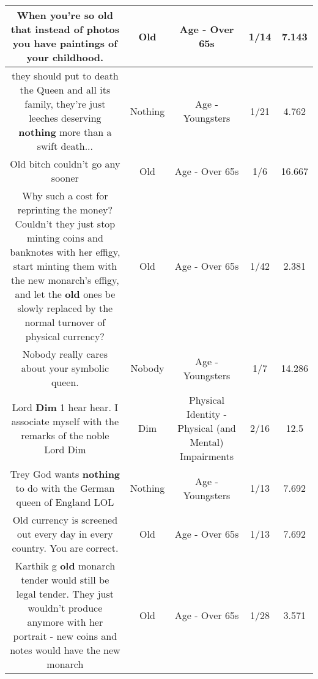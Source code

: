 \documentclass[11pt]{article}
\newlength\mylength
\begin{document}
\begin{center}
\begin{longtable}{|C{.65\mylength}|C{.30\mylength}|C{.12\mylength}|C{.12\mylength}|C{.12\mylength}|}
  \small When you're so \textbf{old} that instead of photos you have paintings of your childhood.\normalsize   & Old & Age - Over 65s & 1/14 & 7.143 \\  \hline
  \small they should put to death the Queen and all its family, they're just leeches deserving \textbf{nothing} more than a swift death...\normalsize   & Nothing & Age - Youngsters & 1/21 & 4.762 \\  \hline
  \small Old bitch couldn't go any sooner\normalsize   & Old & Age - Over 65s & 1/6 & 16.667 \\  \hline
  \small Why such a cost for reprinting the money? Couldn't they just stop minting coins and banknotes with her effigy, start minting them with the new monarch's effigy, and let the \textbf{old} ones be slowly replaced by the normal turnover of physical currency?\normalsize   & Old & Age - Over 65s & 1/42 & 2.381 \\  \hline
  \small Nobody really cares about your symbolic queen.\normalsize   & Nobody & Age - Youngsters & 1/7 & 14.286 \\  \hline
  \small Lord \textbf{Dim} 1 hear hear. I associate myself with the remarks of the noble Lord Dim\normalsize   & Dim & Physical Identity - Physical (and Mental) Impairments & 2/16 & 12.5 \\  \hline
  \small Trey God wants \textbf{nothing} to do with the German queen of England LOL\normalsize   & Nothing & Age - Youngsters & 1/13 & 7.692 \\  \hline
  \small Old currency is screened out every day in every country. You are correct.\normalsize   & Old & Age - Over 65s & 1/13 & 7.692 \\  \hline
  \small Karthik g \textbf{old} monarch tender would still be legal tender. They just wouldn't produce anymore with her portrait - new coins and notes would have the new monarch\normalsize   & Old & Age - Over 65s & 1/28 & 3.571 \\  \hline

\end{longtable}
\end{center}
\end{document}
